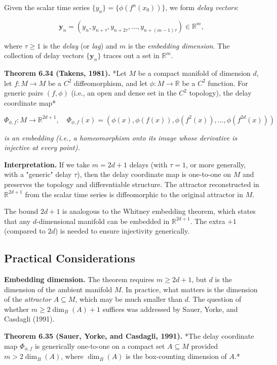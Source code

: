 Given the scalar time series $\{y_n\} = \{\phi(f^n(x_0))\}$, we form \textit{delay vectors}:

\[
\mathbf{y}_n = (y_n, y_{n+\tau}, y_{n+2\tau}, \ldots, y_{n+(m-1)\tau}) \in \mathbb{R}^m,
\]

where $\tau \geq 1$ is the \textit{delay} (or \textit{lag}) and $m$ is the \textit{embedding dimension}. The collection of delay vectors $\{\mathbf{y}_n\}$ traces out a set in $\mathbb{R}^m$.

\textbf{Theorem 6.34 (Takens, 1981).} *Let $M$ be a compact manifold of dimension $d$, let $f: M \to M$ be a $C^2$ diffeomorphism, and let $\phi: M \to \mathbb{R}$ be a $C^2$ function. For generic pairs $(f, \phi)$ (i.e., an open and dense set in the $C^2$ topology), the delay coordinate map*

\[
\Phi_{\phi, f}: M \to \mathbb{R}^{2d+1}, \quad \Phi_{\phi, f}(x) = (\phi(x), \phi(f(x)), \phi(f^2(x)), \ldots, \phi(f^{2d}(x)))
\]

\textit{is an embedding (i.e., a homeomorphism onto its image whose derivative is injective at every point).}

\textbf{Interpretation.} If we take $m = 2d + 1$ delays (with $\tau = 1$, or more generally, with a "generic" delay $\tau$), then the delay coordinate map is one-to-one on $M$ and preserves the topology and differentiable structure. The attractor reconstructed in $\mathbb{R}^{2d+1}$ from the scalar time series is diffeomorphic to the original attractor in $M$.

The bound $2d + 1$ is analogous to the Whitney embedding theorem, which states that any $d$-dimensional manifold can be embedded in $\mathbb{R}^{2d+1}$. The extra $+1$ (compared to $2d$) is needed to ensure injectivity generically.

\subsection{Practical Considerations}\label{sec:6.7.3}

\textbf{Embedding dimension.} The theorem requires $m \geq 2d + 1$, but $d$ is the dimension of the ambient manifold $M$. In practice, what matters is the dimension of the \textit{attractor} $A \subseteq M$, which may be much smaller than $d$. The question of whether $m \geq 2 \dim_B(A) + 1$ suffices was addressed by Sauer, Yorke, and Casdagli (1991).

\textbf{Theorem 6.35 (Sauer, Yorke, and Casdagli, 1991).} *The delay coordinate map $\Phi_{\phi, f}$ is generically one-to-one on a compact set $A \subseteq M$ provided $m > 2 \dim_B(A)$, where $\dim_B(A)$ is the box-counting dimension of $A$.*

